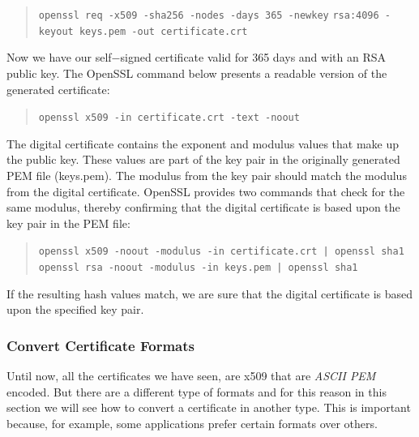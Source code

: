 \documentclass[11pt]{article}
\begin{document}
\begin{quote}
  \verb|openssl req -x509 -sha256 -nodes -days 365 -newkey|\newline
  \verb|rsa:4096 -keyout keys.pem -out certificate.crt|
\end{quote}

Now we have our self$-$signed certificate valid for 365 days and with an RSA public key. The OpenSSL command below presents a readable version of the generated certificate:

\begin{quote}
  \verb|openssl x509 -in certificate.crt -text -noout|
\end{quote}

The digital certificate contains the exponent and modulus values that make up the public key. These values are part of the key pair in the originally generated PEM file (keys.pem). The modulus from the key pair should match the modulus from the digital certificate. OpenSSL provides two commands that check for the same modulus, thereby confirming that the digital certificate is based upon the key pair in the PEM file:

\begin{quote}
  \texttt{openssl x509 -noout -modulus -in certificate.crt | openssl sha1} \newline
  \texttt{openssl rsa -noout -modulus -in keys.pem | openssl sha1}
\end{quote}

If the resulting hash values match, we are sure that the digital certificate is based upon the specified key pair.

\subsubsection{Convert Certificate Formats}
Until now, all the certificates we have seen, are x509 that are {\em ASCII PEM} encoded. But there are a different type of formats and for this reason in this section we will see how to convert a certificate in another type. This is important because, for example, some applications prefer certain formats over others.
\end{document}

